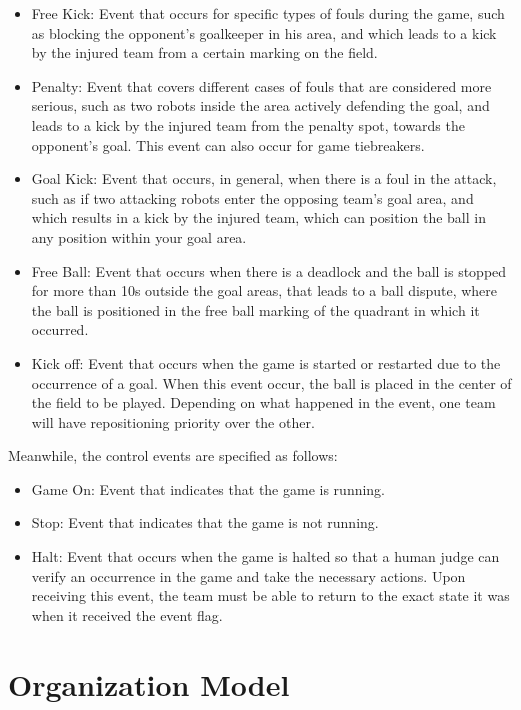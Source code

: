 \begin{itemize}
    \item Free Kick: Event that occurs for specific types of fouls during the game, such as blocking the opponent's goalkeeper in his area, and which leads to a kick by the injured team from a certain marking on the field.
    \item Penalty: Event that covers different cases of fouls that are considered more serious, such as two robots inside the area actively defending the goal, and leads to a kick by the injured team from the penalty spot, towards the opponent's goal. This event can also occur for game tiebreakers.
    \item Goal Kick: Event that occurs, in general, when there is a foul in the attack, such as if two attacking robots enter the opposing team's goal area, and which results in a kick by the injured team, which can position the ball in any position within your goal area.
    \item Free Ball: Event that occurs when there is a deadlock and the ball is stopped for more than 10s outside the goal areas, that leads to a ball dispute, where the ball is positioned in the free ball marking of the quadrant in which it occurred.
    \item Kick off: Event that occurs when the game is started or restarted due to the occurrence of a goal. When this event occur, the ball is placed in the center of the field to be played. Depending on what happened in the event, one team will have repositioning priority over the other.
 \end{itemize}

Meanwhile, the control events are specified as follows:
    
\begin{itemize}
     \item Game On: Event that indicates that the game is running.
     \item Stop: Event that indicates that the game is not running.
     \item Halt: Event that occurs when the game is halted so that a human judge can verify an occurrence in the game and take the necessary actions. Upon receiving this event, the team must be able to return to the exact state it was when it received the event flag.
  \end{itemize}

\section{Organization Model}
\label{sec:organization_model}

